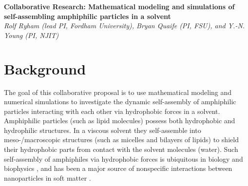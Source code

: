 \noindent
{\bf Collaborative Research: Mathematical modeling and simulations of
self-assembling amphiphilic particles in a solvent} \\
{\em Rolf Ryham (lead PI, Fordham University), Bryan Quaife (PI,
FSU), and Y.-N. Young (PI, NJIT)}
\section{Background}
\label{sec:background}
The goal of this collaborative proposal is to use mathematical modeling
and numerical simulations to investigate the dynamic self-assembly of
amphiphilic particles interacting with each other via hydrophobic forces
in a solvent. Amphiphilic particles (such as lipid molecules) possess
both hydrophobic and hydrophilic structures. In a viscous solvent they
self-assemble into meso-/macroscopic structures (such as micelles and
bilayers of lipids) to shield their hydrophobic parts from contact with
the solvent molecules (water).
%
%
Such self-assembly of amphiphiles via hydrophobic forces is ubiquitous in biology and biophysics \cite{Israelachvili1954},
and has been a major source of nonspecific interactions between
nanoparticles in  soft matter
\cite{Sanchez-IglesiasEtAl2012_ACSNano,AltantzisEtAl2013_PSC,XieYangLuEtAl2020_COCIS}. 



